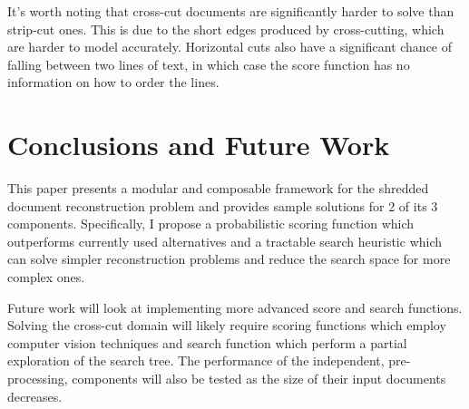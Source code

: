 \documentclass[letterpaper]{article}
\begin{document}
It's worth noting that cross-cut documents are significantly harder to solve than strip-cut ones. This is due to the short edges produced by cross-cutting, which are harder to model accurately. Horizontal cuts also have a significant chance of falling between two lines of text, in which case the score function has no information on how to order the lines.
\section{
\fontsize{12pt}{15pt} 
\selectfont
Conclusions and Future Work}
\fontsize{10pt}{12pt} 
\selectfont
This paper presents a modular and composable framework for the shredded document reconstruction problem and provides sample solutions for 2 of its 3 components. Specifically, I propose a probabilistic scoring function which outperforms currently used alternatives and a tractable search heuristic which can solve simpler reconstruction problems and reduce the search space for more complex ones.

Future work will look at implementing more advanced score and search functions. Solving the cross-cut domain will likely require scoring functions which employ computer vision techniques and search function which perform a partial exploration of the search tree. The performance of the independent, pre-processing, components will also be tested as the size of their input documents decreases.



\end{document}
